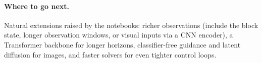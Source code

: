 \documentclass[11pt]{article}
\begin{document}
\paragraph{Where to go next.} Natural extensions raised by the notebooks: richer observations (include
the block state, longer observation windows, or visual inputs via a CNN encoder), a Transformer backbone
for longer horizons, classifier-free guidance and latent diffusion for images, and faster solvers for
even tighter control loops.
\end{document}
